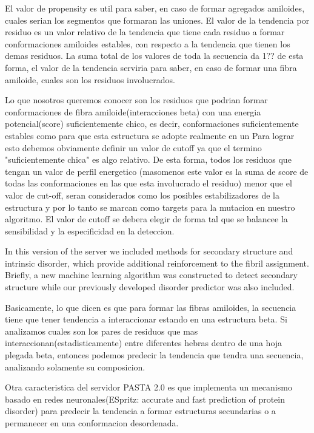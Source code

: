 El valor de propensity es util para saber, en caso de formar agregados amiloides, cuales serian los segmentos que formaran las uniones.
El valor de la tendencia por residuo es un valor relativo de la tendencia que tiene cada residuo a formar conformaciones amiloides estables, con respecto a la tendencia que tienen los demas residuos. La suma total de los valores de toda la secuencia da 1?? de esta forma, el valor de la tendencia serviria para saber, en caso de formar una fibra amiloide, cuales son los residuos involucrados.


Lo que nosotros queremos conocer son los residuos que podrian formar conformaciones de fibra amiloide(interacciones beta) con una energia potencial(score) suficientemente chico, es decir, conformaciones suficientemente estables como para que esta estructura se adopte realmente en un %
Para lograr esto debemos obviamente definir un valor de cutoff ya que el termino "suficientemente chica" es algo relativo. De esta forma, todos los residuos que tengan un valor de perfil energetico (masomenos este valor es la suma de score de todas las conformaciones en las que esta involucrado el residuo) menor que el valor de cut-off, seran considerados como los posibles estabilizadores de la estructura y por lo tanto se marcan como targets para la mutacion en nuestro algoritmo.
El valor de cutoff se debera elegir de forma tal que se balancee la sensibilidad y la especificidad en la deteccion.


In this version of the server we included methods for secondary structure and intrinsic disorder, which provide additional reinforcement to the fibril assignment. Briefly, a new machine learning algorithm was constructed to detect secondary structure while our previously developed disorder predictor was also included.


Basicamente, lo que dicen es que para formar las fibras amiloides, la secuencia tiene que tener tendencia a interaccionar estando en una estructura beta. Si analizamos cuales son los pares de residuos que mas interaccionan(estadisticamente) entre diferentes hebras dentro de una hoja plegada beta, entonces podemos predecir la tendencia que tendra una secuencia, analizando solamente su composicion.



Otra caracteristica del servidor PASTA 2.0 es que implementa un mecanismo basado en redes neuronales(ESpritz: accurate and fast prediction of protein disorder) para predecir la tendencia a formar estructuras secundarias o a permanecer en una conformacion desordenada. 





